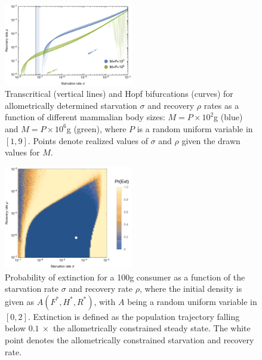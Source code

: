 \documentclass{pnastwo}
\begin{document}
\begin{figure}
\centering
\includegraphics[width=0.5\textwidth]{fig_DataHopf.pdf}
\caption{ Transcritical (vertical lines) and Hopf bifurcations (curves) for
  allometrically determined starvation $\sigma$ and recovery $\rho$ rates as
  a function of different mammalian body sizes: $M=P\times10^2$g (blue) and
  $M=P\times10^6$g (green), where $P$ is a random uniform variable in $[1,9]$.
  Points denote realized values of $\sigma$ and $\rho$ given the drawn values for $M$.
  }
\label{fig:hopf}
\end{figure}

\begin{figure}
\centering
\includegraphics[width=0.5\textwidth]{fig_ExtinctionAllometric2.png}
\caption{ Probability of extinction for a 100g consumer as a function of the starvation rate $\sigma$ and recovery rate $\rho$, where the initial density is given as $A(F^*,H^*,R^*)$, with
  $A$ being a random uniform variable in $[0,2]$.  Extinction is defined as the
  population trajectory falling below $0.1~\times$ the allometrically
  constrained steady state. The white point denotes the allometrically constrained starvation and recovery rate.}
\label{fig:ext}
\end{figure}
\end{document}
